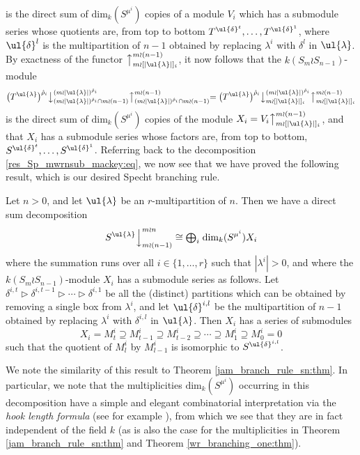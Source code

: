 is the direct sum of $\mathrm{dim}_k(S^{\mu^i})$ copies of a module $V_i$ which has a submodule series whose quotients are, from top to
bottom $T^{\ul{\delta}^t}, \ldots, T^{\ul{\delta}^1}$, where $\ul{\delta}^l$ is the multipartition of $n-1$ obtained by replacing $\lambda^i$
with $\delta^l$ in $\ul{\lambda}$. By exactness of the functor $\bigl\uparrow^{m \wr (n-1)}_{m \wr [|\ul{\lambda}|]_i}$, it now follows that the
$k(S_m \wr S_{n-1})$-module
\[
\bigl(T^{\ul{\lambda}}\bigr)^{\hat\rho_i}\bigl\downarrow^{(m{\wr}|\ul{\lambda}|)^{\hat\rho_i}}_{(m{\wr}|\ul{\lambda}|)^{\hat\rho_i} \cap m \wr (n-1)}
\bigl\uparrow^{m \wr (n-1)}_{(m{\wr}|\ul{\lambda}|)^{\hat\rho_i} \cap m \wr (n-1)}
=
\bigl(T^{\ul{\lambda}}\bigr)^{\hat\rho_i}\bigl\downarrow^{(m{\wr}|\ul{\lambda}|)^{\hat\rho_i}}_{m \wr [|\ul{\lambda}|]_i}
\bigl\uparrow^{m \wr (n-1)}_{m \wr [|\ul{\lambda}|]_i}
\]
is the direct sum of $\mathrm{dim}_k(S^{\mu^i})$ copies of the module $X_i = V_i\bigl\uparrow^{m \wr (n-1)}_{m \wr [|\ul{\lambda}|]_i}$, and that
$X_i$ has a submodule series whose factors are, from top to bottom, $S^{\ul{\delta}^t},\ldots,S^{\ul{\delta}^1}$.
Referring back to the decomposition \eqref{res_Sp_mwrnsub_mackey:eq}, we now see that we have proved the following result, which is our
desired Specht branching rule.

\begin{theo}
Let $n>0$, and let $\ul{\lambda}$ be an $r$-multipartition of $n$. Then we have a direct sum decomposition
\[\left.S^{\ul{\lambda}}\right\downarrow^{m \wr n}_{m \wr (n-1)} \cong {\textstyle \bigoplus_i}\;\mathrm{dim}_k(S^{\mu^i})X_i\]
where the summation runs over all $i \in \{1,\ldots,r\}$ such that $|\lambda^i| > 0$, and where the $k(S_m \wr S_{n-1})$-module $X_i$ has a
submodule series as follows. Let $\delta^{i,t} \triangleright \delta^{i,t-1} \triangleright \cdots \triangleright \delta^{i,1}$ be all the
(distinct) partitions which can be obtained by removing a single box from $\lambda^i$, and let $\ul{\delta}^{i,l}$ be the multipartition
of $n-1$ obtained by replacing $\lambda^i$ with $\delta^{i,l}$ in $\ul{\lambda}$. Then $X_i$ has a series of submodules
\[ X_i  = M^i_t \supseteq M^i_{t-1} \supseteq M^i_{t-2} \supseteq \cdots \supseteq M^i_1 \supseteq M^i_0 = 0 \]
such that the quotient of $M^i_l$ by $M^i_{l-1}$ is isomorphic to $S^{\ul{\delta}^{i,l}}$.
\end{theo}

We note the similarity of this result to Theorem \ref{jam_branch_rule_sn:thm}. In particular, we note that the multiplicities
$\mathrm{dim}_k(S^{\mu^i})$ occurring in this decomposition have a simple and elegant combinatorial interpretation via the
\textit{hook length formula} (see for example \cite[Chapter 20]{JAMSN}), from which we see that they are in fact independent of the field
$k$ (as is also the case for the multiplicities in Theorem \ref{jam_branch_rule_sn:thm} and Theorem \ref{wr_branching_one:thm}).

